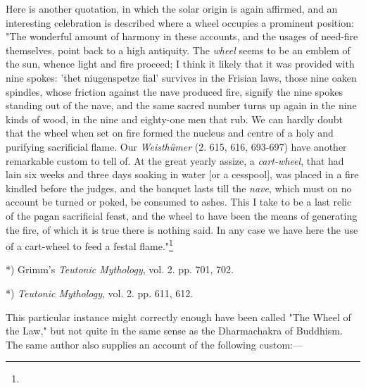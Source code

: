 \documentclass[a4paper, 11pt, oneside, polutonikogreek, english]{article}
\begin{document}
Here is another quotation, in which the solar origin is again affirmed, and an interesting celebration is described where a wheel occupies a prominent position: "The wonderful amount of harmony in these accounts, and the usages of need-fire themselves, point back to a high antiquity. The \emph{wheel} seems to be an emblem of the sun, whence light and fire proceed; I think it likely that it was provided with nine spokes: 'thet niugenspetze fial' survives in the Frisian laws, those nine oaken spindles, whose friction against the nave produced fire, signify the nine spokes standing out of the nave, and the same sacred number turns up again in the nine kinds of wood, in the nine and eighty-one men that rub. We can hardly doubt that the wheel when set on fire formed the nucleus and centre of a holy and purifying sacrificial flame. Our \emph{Weisthümer} (2. 615, 616, 693-697) have another remarkable custom to tell of. At the great yearly assize, a \emph{cart-wheel}, that had lain six weeks and three days soaking in water [or a cesspool], was placed in a fire kindled before the judges, and the banquet lasts till the \emph{nave}, which must on no account be turned or poked, be consumed to ashes. This I take to be a last relic of the pagan sacrificial feast, and the wheel to have been the means of generating the fire, of which it is true there is nothing said. In any case we have here the use of a cart-wheel to feed a festal flame."\footnote{}

*) Grimm's \emph{Teutonic Mythology}, vol. 2. pp. 701, 702.

*) \emph{Teutonic Mythology}, vol. 2. pp. 611, 612.

This particular instance might correctly enough have been called "The Wheel of the Law," but not quite in the same sense as the Dharmachakra of Buddhism. The same author also supplies an account of the following custom:---
\end{document}
